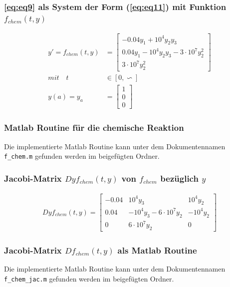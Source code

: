 \documentclass[
	pagesize,
	fontsize=12pt,
	paper=a4,
	oneside,
   reqno
]{scrartcl}
\begin{document}
\subsubsection{\autoref{eq:eq9} als System der Form (\ref{eq:eq11}) mit Funktion $f_{chem}(t,y)$}

\begin{align*}
   y' = f_{chem}(t,y) &=
   \begin{bmatrix*}
      -0.04y_1+10^4y_2y_3 \\
      0.04y_1-10^4y_2y_3-3\cdot 10^7y_2^2 \\
      3\cdot 10^7y_2^2
   \end{bmatrix*} \\
   mit \quad t &\in [0,\backsim ] \\
   y(a) = y_a &=
   \begin{bmatrix*}
      1 \\
      0 \\
      0
   \end{bmatrix*}
\end{align*}

\subsubsection{Matlab Routine für die chemische Reaktion}

Die implementierte Matlab Routine kann unter dem Dokumentennamen \texttt{f\_chem.m} gefunden werden im beigefügten Ordner.

\subsubsection{Jacobi-Matrix $Dyf_{chem}(t,y)$ von $f_{chem}$ bezüglich $y$}

\begin{align*}
   Dyf_{chem}(t,y) =
   \begin{bmatrix*}
      -0.04 & 10^4y_3 & 10^4y_2 \\
      0.04 & -10^4y_3-6\cdot 10^7y_2 & -10^4y_2 \\
      0 & 6\cdot 10^7y_2 & 0
   \end{bmatrix*}
\end{align*}

\subsubsection{Jacobi-Matrix $Df_{chem}(t,y)$ als Matlab Routine}

Die implementierte Matlab Routine kann unter dem Dokumentennamen \texttt{f\_chem\_jac.m} gefunden werden im beigefügten Ordner.
\end{document}
